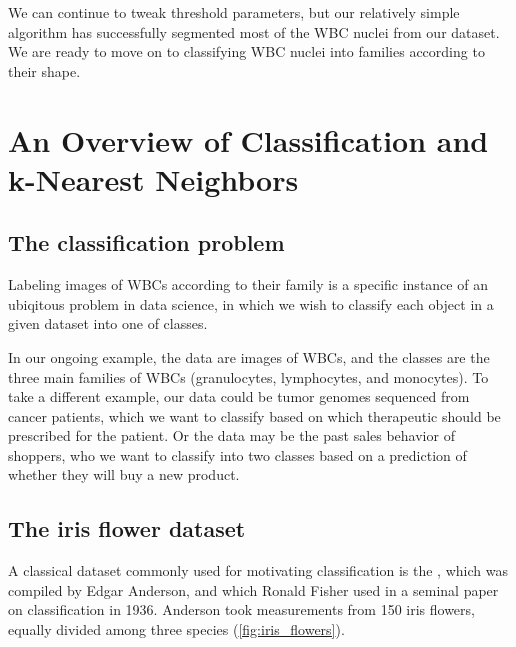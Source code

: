 We can continue to tweak threshold parameters, but our relatively simple algorithm has successfully segmented most of the WBC nuclei from our dataset. We are ready to move on to classifying WBC nuclei into families according to their shape.

\FloatBarrier
{}
\section{An Overview of Classification and k-Nearest Neighbors}
\label{sec:knn}


\subsection{The classification problem}

Labeling images of WBCs according to their family is a specific instance of an ubiqitous problem in data science, in which we wish to classify each object in a given dataset into one of  classes.

In our ongoing example, the data are images of WBCs, and the classes are the three main families of WBCs (granulocytes, lymphocytes, and monocytes). To take a different example, our data could be tumor genomes sequenced from cancer patients, which we want to classify based on which therapeutic should be prescribed for the patient. Or the data may be the past sales behavior of shoppers, who we want to classify into two classes based on a prediction of whether they will buy a new product.

\FloatBarrier
{}
\subsection{The iris flower dataset}

A classical dataset commonly used for motivating classification is the , which was compiled by Edgar Anderson, and which Ronald Fisher used in a seminal paper on classification in 1936. Anderson took measurements from 150 iris flowers, equally divided among three species (\autoref{fig:iris_flowers}).\\

